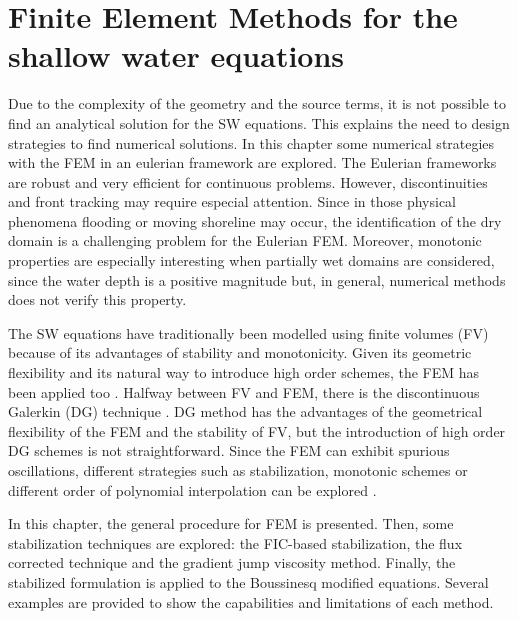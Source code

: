 
\chapter{Finite Element Methods for the shallow water equations}
\label{eulerian_sw}


Due to the complexity of the geometry and the source terms, it is not possible to find an analytical solution for the SW equations. This explains the need to design strategies to find numerical solutions. In this chapter some numerical strategies with the FEM in an eulerian framework are explored.
The Eulerian frameworks are robust and very efficient for continuous problems. However, discontinuities and front tracking may require especial attention. Since in those physical phenomena flooding or moving shoreline may occur, the identification of the dry domain is a challenging problem for the Eulerian FEM.
Moreover, monotonic properties are especially interesting when partially wet domains are considered, since the water depth is a positive magnitude but, in general, numerical methods does not verify this property.

The SW equations have traditionally been modelled using finite volumes (FV) because of its advantages of stability and monotonicity. Given its geometric flexibility and its natural way to introduce high order schemes, the FEM has been applied too \cite{zien3,navon1979,navon1988}.
Halfway between FV and FEM, there is the discontinuous Galerkin (DG) technique \cite{ambati2007,khan2014,lee2019}. DG method has the advantages of the geometrical flexibility of the FEM and the stability of FV, but the introduction of high order DG schemes is not straightforward.
Since the FEM can exhibit spurious oscillations, different strategies such as stabilization, monotonic schemes or different order of polynomial interpolation can be explored \cite{hood1974,zien3,ortiz2012}.





In this chapter, the general procedure for FEM is presented. Then, some stabilization techniques are explored: the FIC-based stabilization, the flux corrected technique and the gradient jump viscosity method. Finally, the stabilized formulation is applied to the Boussinesq modified equations. Several examples are provided to show the capabilities and limitations of each method.




